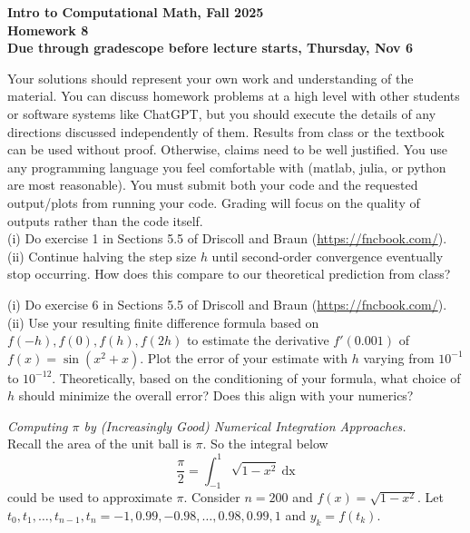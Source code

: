 \documentclass[11pt]{article}
\begin{document}
\begin{center}
{\bf Intro to Computational Math, Fall 2025\\
Homework 8\\
Due through gradescope before lecture starts, Thursday, Nov 6}
\end{center}

Your solutions should represent your own work and understanding of the material. You can discuss homework problems at a high level with other students or software systems like ChatGPT, but you should execute the details of any directions discussed independently of them. Results from class or the textbook can be used without proof. Otherwise, claims need to be well justified. You use any programming language you feel comfortable with (matlab, julia, or python are most reasonable). You must submit both your code and the requested output/plots from running your code. Grading will focus on the quality of outputs rather than the code itself.\\

(i) Do exercise 1 in Sections 5.5 of Driscoll and Braun (\url{https://fncbook.com/}).\\

\noindent (ii) Continue halving the step size $h$ until second-order convergence eventually stop occurring. How does this compare to our theoretical prediction from class?

\vskip0.5cm

(i) Do exercise 6 in Sections 5.5 of Driscoll and Braun (\url{https://fncbook.com/}).\\

\noindent (ii) Use your resulting finite difference formula based on $f(-h), f(0), f(h), f(2h)$ to estimate the derivative $f'(0.001)$ of $f(x) = \sin(x^2+x)$. Plot the error of your estimate with $h$ varying from $10^{-1}$ to $10^{-12}$. Theoretically, based on the conditioning of your formula, what choice of $h$ should minimize the overall error? Does this align with your numerics?


\vskip1cm

 {\it Computing $\pi$ by (Increasingly Good) Numerical Integration Approaches.}\\
Recall the area of the unit ball is $\pi$. So the integral below 
$$ \frac{\pi}{2} = \int^1_{-1} \sqrt{1-x^2}\ \mathrm{dx} $$
could be used to approximate $\pi$. Consider $n=200$ and $f(x) = \sqrt{1-x^2}$.
Let $t_0, t_1, \dots, t_{n-1}, t_n = -1, 0.99, -0.98, \dots, 0.98, 0.99, 1$ and $y_k = f(t_k)$.\\
\end{document}
